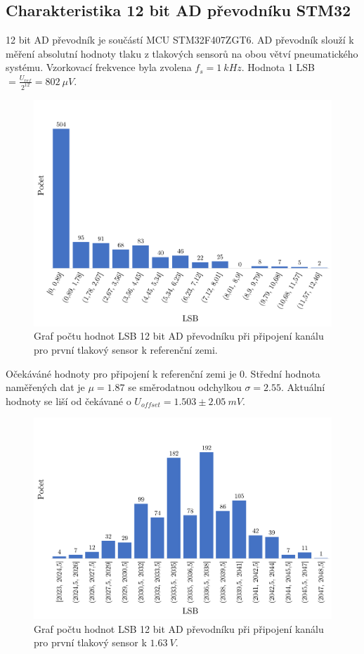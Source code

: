 \subsection{Charakteristika 12 bit AD převodníku STM32}
12 bit AD převodník je součástí MCU STM32F407ZGT6. AD převodník slouží k měření absolutní hodnoty tlaku z tlakových sensorů na obou větví pneumatického systému. Vzorkovací frekvence byla zvolena $f_s = 1 \ kHz$.
Hodnota 1 LSB $= \frac{U_{ref}}{2^{12}} = 802 \ \mu V$.
\begin{figure}[H]
    \caption{Graf počtu hodnot LSB 12 bit AD převodníku při připojení kanálu pro první tlakový sensor k referenční zemi.}
    \label{fig:hist_vacuum1_gnd}
    \includegraphics[width=1\textwidth]{graphs/vacuum1_gnd.png}

\end{figure}
Očekáváné hodnoty pro připojení k referenční zemi je 0. Střední hodnota naměřených dat je $\mu = 1.87$ se směrodatnou odchylkou $\sigma = 2.55$. Aktuální hodnoty se liší od čekávané o $U_{offset} = 1.503 \pm 2.05 \ mV$.

\begin{figure}[H]
    \caption{Graf počtu hodnot LSB 12 bit AD převodníku při připojení kanálu pro první tlakový sensor k $1.63 \ V$.}
    \label{fig:hist_vacuum1_1_6}
    \includegraphics[width=1\textwidth]{graphs/vacuum1_16.png}

\end{figure}

